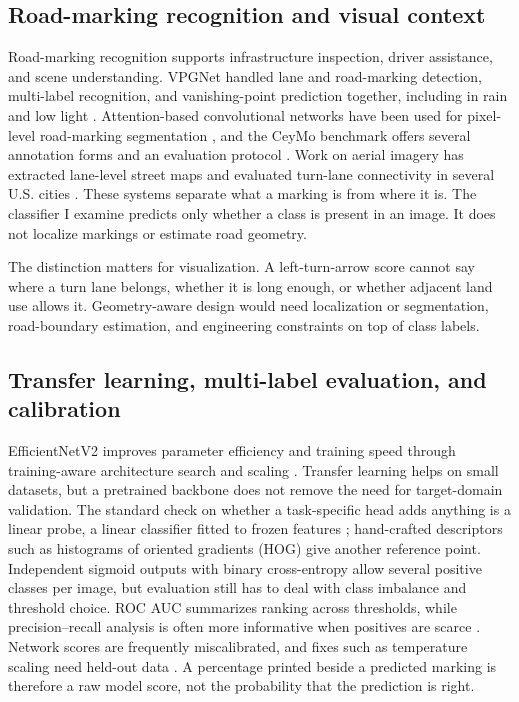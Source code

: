 \documentclass[11pt]{article}
\begin{document}
\subsection{Road-marking recognition and visual context}
Road-marking recognition supports infrastructure inspection, driver assistance, and scene understanding. VPGNet handled lane and road-marking detection, multi-label recognition, and vanishing-point prediction together, including in rain and low light \citep{lee2017}. Attention-based convolutional networks have been used for pixel-level road-marking segmentation \citep{wu2022}, and the CeyMo benchmark offers several annotation forms and an evaluation protocol \citep{jayasinghe2022}. Work on aerial imagery has extracted lane-level street maps and evaluated turn-lane connectivity in several U.S. cities \citep{he2022}. These systems separate what a marking is from where it is. The classifier I examine predicts only whether a class is present in an image. It does not localize markings or estimate road geometry.

The distinction matters for visualization. A left-turn-arrow score cannot say where a turn lane belongs, whether it is long enough, or whether adjacent land use allows it. Geometry-aware design would need localization or segmentation, road-boundary estimation, and engineering constraints on top of class labels.

\subsection{Transfer learning, multi-label evaluation, and calibration}
EfficientNetV2 improves parameter efficiency and training speed through training-aware architecture search and scaling \citep{tan2021}. Transfer learning helps on small datasets, but a pretrained backbone does not remove the need for target-domain validation. The standard check on whether a task-specific head adds anything is a linear probe, a linear classifier fitted to frozen features \citep{alain2017}; hand-crafted descriptors such as histograms of oriented gradients (HOG) \citep{dalal2005} give another reference point. Independent sigmoid outputs with binary cross-entropy allow several positive classes per image, but evaluation still has to deal with class imbalance and threshold choice. ROC AUC summarizes ranking across thresholds, while precision--recall analysis is often more informative when positives are scarce \citep{saito2015}. Network scores are frequently miscalibrated, and fixes such as temperature scaling need held-out data \citep{guo2017}. A percentage printed beside a predicted marking is therefore a raw model score, not the probability that the prediction is right.
\end{document}
